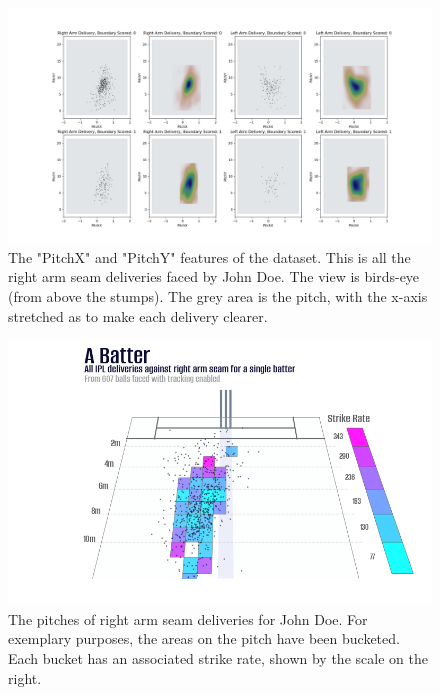 \documentclass[12pt,a4paper]{report}
\theoremstyle{definition}
\begin{document}
\begin{figure}
    \centering
    \includegraphics[width=\linewidth]{pitch_bounce.png}
    \caption{The "PitchX" and "PitchY" features of the dataset. This is all the right arm seam deliveries faced by John Doe. The view is birds-eye (from above the stumps). The grey area is the pitch, with the x-axis stretched as to make each delivery clearer.}
    \label{fig:PitchXY}
\end{figure}

\begin{figure}
    \centering
    \includegraphics[width=\linewidth]{right_arm_seam_pitch_strike_rate.png}
    \caption{The pitches of right arm seam deliveries for John Doe. For exemplary purposes, the areas on the pitch have been bucketed. Each bucket has an associated strike rate, shown by the scale on the right.}
    \label{fig:PitchXYStrikeRate}
\end{figure}
\end{document}

